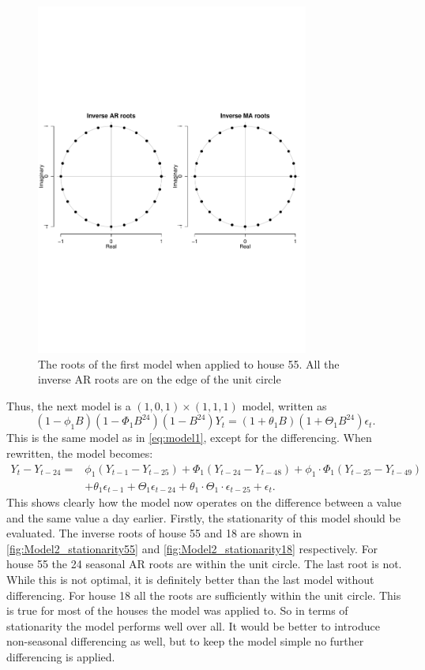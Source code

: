\begin{figure}
    \centering
    \includegraphics[width=0.8\textwidth]{../../../figures/arimax/Stationarity_model1.pdf}
    \caption{The roots of the first model when applied to house 55. All the inverse AR roots are on the edge of the unit circle}
    \label{fig:Model1_stationarity}
\end{figure}

\noindent Thus, the next model is a $(1,0,1)\times(1,1,1)$ model, written as
\begin{equation}
    (1-\phi_1 B)(1-\Phi_1 B^{24})(1-B^{24})Y_t = (1+\theta_1 B)(1+\Theta_1 B^{24}) \epsilon_t.
\end{equation}
This is the same model as in \cref{eq:model1}, except for the differencing. When rewritten, the model becomes:
\begin{align}
    Y_t-Y_{t-24} = &\phi_1 (Y_{t-1}-Y_{t-25}) + \Phi_1 (Y_{t-24}-Y_{t-48}) + \phi_1 \cdot \Phi_1  (Y_{t-25}-Y_{t-49}) \label{model101111}\\  &+ \theta_1 \epsilon_{t-1} + \Theta_1 \epsilon_{t-24} + \theta_1 \cdot \Theta_1 \cdot \epsilon_{t-25} + \epsilon_t. \nonumber
\end{align}
This shows clearly how the model now operates on the difference between a value and the same value a day earlier. Firstly, the stationarity of this model should be evaluated. The inverse roots of house 55 and 18 are shown in \cref{fig:Model2_stationarity55} and \cref{fig:Model2_stationarity18} respectively. For house 55 the 24 seasonal AR roots are within the unit circle. The last root is not. While this is not optimal, it is definitely better than the last model without differencing. For house 18 all the roots are sufficiently within the unit circle. This is true for most of the houses the model was applied to. So in terms of stationarity the model performs well over all. It would be better to introduce non-seasonal differencing as well, but to keep the model simple no further differencing is applied.


